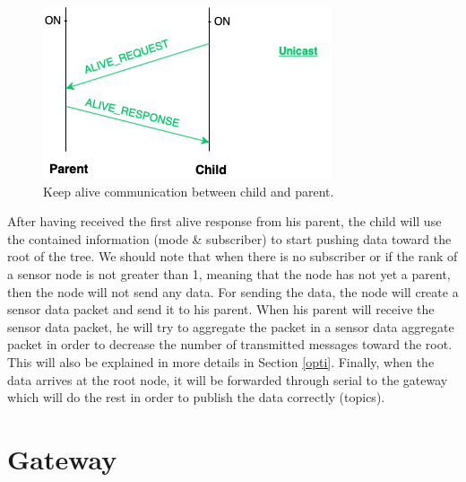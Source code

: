 \documentclass[a4paper,10pt]{article}
\begin{document}
\begin{figure}
\centering
\includegraphics[scale=0.6]{./img/alive.png}
\caption{Keep alive communication between child and parent.}
\label{fig:alive}
\end{figure}

After having received the first alive response from his parent, the child will use the contained information (mode \& subscriber) to start pushing data toward the root of the tree. We should note that when there is no subscriber or if the rank of a sensor node is not greater than 1,  meaning that the node has not yet a parent, then the node will not send any data. For sending the data, the node will create a sensor data packet and send it to his parent. When his parent will receive the sensor data packet, he will try to aggregate the packet in a sensor data aggregate packet in order to decrease the number of transmitted messages toward the root. This will also be explained in more details in Section \ref{opti}. Finally, when the data arrives at the root node, it will be forwarded through serial to the gateway which will do the rest in order to publish the data correctly (topics).

\section{Gateway}
\label{gateway}
\end{document}
